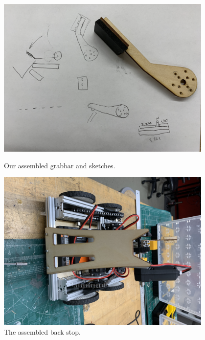 \begin{figure}[ht]
\centering
\begin{minipage}[b]{.48\textwidth}
  \centering
  \includegraphics[width=0.95\textwidth]{Meetings/October/10-11-21/10-11-21_Hardware_Figure5 - Nathan Forrer.JPG}
  \caption{Our assembled grabbar and sketches.}
  \label{fig:101121_5}
\end{minipage}%
\hfill%
\begin{minipage}[b]{.48\textwidth}
  \centering
  \includegraphics[width=0.95\textwidth]{Meetings/October/10-11-21/10-11-21_Hardware_Figure6 - Nathan Forrer.JPG}
  \caption{The assembled back stop.}
  \label{fig:101121_6}
\end{minipage}
\end{figure}



